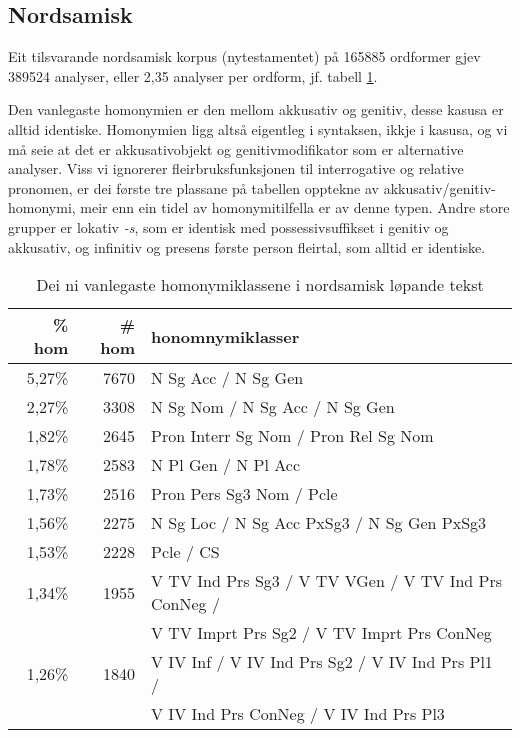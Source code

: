 \documentclass[a4paper,norsk]{article}
\begin{document}
\subsection{Nordsamisk}

Eit tilsvarande nordsamisk korpus (nytestamentet) på 165885 ordformer gjev 389524 analyser, eller 2,35 analyser per ordform, jf. tabell \ref{smehom}.%

Den vanlegaste homonymien er den mellom akkusativ og genitiv, desse kasusa er alltid identiske. Homonymien ligg altså eigentleg i syntaksen, ikkje i kasusa, og vi må seie at det er akkusativobjekt og genitivmodifikator som er alternative analyser. Viss vi ignorerer fleirbruksfunksjonen til interrogative og relative pronomen, er dei første tre plassane på tabellen opptekne av akkusativ/genitiv-homonymi, meir enn ein tidel av homonymitilfella er av denne typen. Andre store grupper er lokativ \textit{-s}, som er identisk med possessivsuffikset i genitiv og akkusativ, og infinitiv og presens første person fleirtal, som alltid er identiske.%


\begin{table}[htdp]
\caption{Dei ni vanlegaste homonymiklassene i nordsamisk løpande tekst}
\begin{center}
\begin{tabular}{|r|r|l|}
\hline
\% hom & \# hom & honomnymiklasser \\
\hline
5,27\% & 7670 & N Sg Acc /  N Sg Gen \\
2,27\% & 3308 & N Sg Nom /  N Sg Acc /  N Sg Gen \\
1,82\% & 2645 & Pron Interr Sg Nom /  Pron Rel Sg Nom \\
1,78\% & 2583 & N Pl Gen /  N Pl Acc \\
1,73\% & 2516 & Pron Pers Sg3 Nom /  Pcle \\
1,56\% & 2275 & N Sg Loc /  N Sg Acc PxSg3 /  N Sg Gen PxSg3 \\
1,53\% & 2228 & Pcle /  CS \\
1,34\% & 1955 & V TV Ind Prs Sg3 /  V TV VGen /  V TV Ind Prs ConNeg /  \\  
       &      & V TV Imprt Prs Sg2 /  V TV Imprt Prs ConNeg \\
1,26\% & 1840 & V IV Inf /  V IV Ind Prs Sg2 /  V IV Ind Prs Pl1 / \\
       &      & V IV Ind Prs ConNeg /  V IV Ind Prs Pl3 \\
\hline
\end{tabular}
\end{center}
\label{smehom}
\end{table}%
\end{document}
